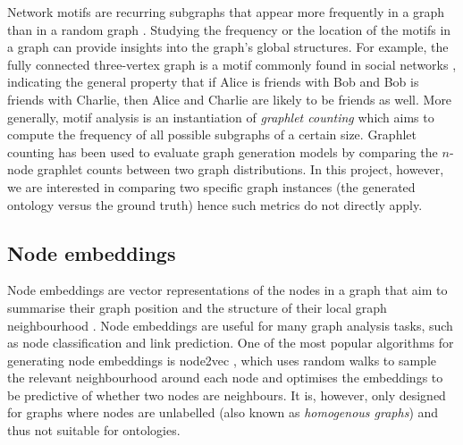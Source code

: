 Network motifs are recurring subgraphs that appear more frequently in a graph than in a random graph \cite{milo2002network}. Studying the frequency or the location of the motifs in a graph can provide insights into the graph's global structures. For example, the fully connected three-vertex graph is a motif commonly found in social networks \cite{stone2019network}, indicating the general property that if Alice is friends with Bob and Bob is friends with Charlie, then Alice and Charlie are likely to be friends as well. More generally, motif analysis is an instantiation of \emph{graphlet counting} \cite{ribeiro2021survey} which aims to compute the frequency of all possible subgraphs of a certain size. Graphlet counting has been used to evaluate graph generation models \cite{you2018graphrnn} by comparing the $n$-node graphlet counts between two graph distributions. In this project, however, we are interested in comparing two specific graph instances (the generated ontology versus the ground truth) hence such metrics do not directly apply.

\subsection{Node embeddings}  \label{sec:node-embeddings}

Node embeddings are vector representations of the nodes in a graph that aim to summarise their graph position and the structure of their local graph neighbourhood \cite{hamilton2020graph}. Node embeddings are useful for many graph analysis tasks, such as node classification and link prediction. One of the most popular algorithms for generating node embeddings is node2vec \cite{grover2016node2vec}, which uses random walks to sample the relevant neighbourhood around each node and optimises the embeddings to be predictive of whether two nodes are neighbours. It is, however, only designed for graphs where nodes are unlabelled (also known as \emph{homogenous graphs}) and thus not suitable for ontologies.

